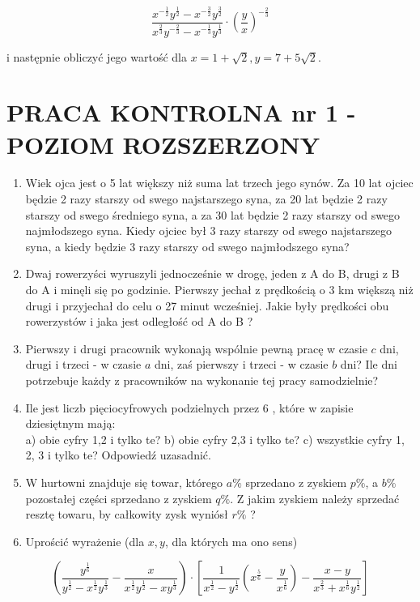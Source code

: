 \documentclass[10pt]{article}
\begin{document}
$$
\frac{x^{-\frac{1}{2}} y^{\frac{1}{2}}-x^{-\frac{3}{2}} y^{\frac{3}{2}}}{x^{\frac{2}{3}} y^{-\frac{2}{3}}-x^{-\frac{1}{3}} y^{\frac{1}{3}}} \cdot\left(\frac{y}{x}\right)^{-\frac{2}{3}}
$$

i następnie obliczyć jego wartość dla $x=1+\sqrt{2}, y=7+5 \sqrt{2}$.

\section*{PRACA KONTROLNA nr 1 - POZIOM ROZSZERZONY}
\begin{enumerate}
  \item Wiek ojca jest o 5 lat większy niż suma lat trzech jego synów. Za 10 lat ojciec będzie 2 razy starszy od swego najstarszego syna, za 20 lat będzie 2 razy starszy od swego średniego syna, a za 30 lat będzie 2 razy starszy od swego najmłodszego syna. Kiedy ojciec był 3 razy starszy od swego najstarszego syna, a kiedy będzie 3 razy starszy od swego najmłodszego syna?
  \item Dwaj rowerzyści wyruszyli jednocześnie w drogę, jeden z A do B, drugi z B do A i minęli się po godzinie. Pierwszy jechał z prędkością o 3 km większą niż drugi i przyjechał do celu o 27 minut wcześniej. Jakie były prędkości obu rowerzystów i jaka jest odległość od A do B ?
  \item Pierwszy i drugi pracownik wykonają wspólnie pewną pracę w czasie $c$ dni, drugi i trzeci - w czasie $a$ dni, zaś pierwszy i trzeci - w czasie $b$ dni? Ile dni potrzebuje każdy z pracowników na wykonanie tej pracy samodzielnie?
  \item Ile jest liczb pięciocyfrowych podzielnych przez 6 , które w zapisie dziesiętnym mają:\\
a) obie cyfry 1,2 i tylko te? b) obie cyfry 2,3 i tylko te? c) wszystkie cyfry 1, 2, 3 i tylko te? Odpowiedź uzasadnić.
  \item W hurtowni znajduje się towar, którego $a \%$ sprzedano z zyskiem $p \%$, a $b \%$ pozostałej części sprzedano z zyskiem $q \%$. Z jakim zyskiem należy sprzedać resztę towaru, by całkowity zysk wyniósł $r \%$ ?
  \item Uprościć wyrażenie (dla $x, y$, dla których ma ono sens)
\end{enumerate}

$$
\left(\frac{y^{\frac{1}{6}}}{y^{\frac{1}{2}}-x^{\frac{1}{2}} y^{\frac{1}{3}}}-\frac{x}{x^{\frac{1}{2}} y^{\frac{1}{2}}-x y^{\frac{1}{3}}}\right) \cdot\left[\frac{1}{x^{\frac{1}{2}}-y^{\frac{1}{2}}}\left(x^{\frac{5}{6}}-\frac{y}{x^{\frac{1}{6}}}\right)-\frac{x-y}{x^{\frac{2}{3}}+x^{\frac{1}{6}} y^{\frac{1}{2}}}\right]
$$
\end{document}
